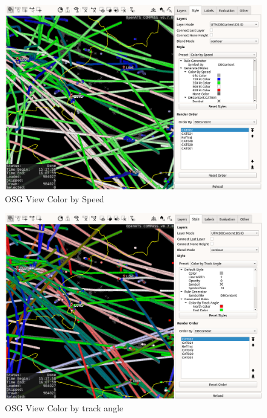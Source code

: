 \begin{figure}[H]
    \hspace*{-2.5cm}
    \includegraphics[width=19cm,frame]{figures/osgview_style_speed.png}
  \caption{OSG View Color by Speed}
\end{figure}

\begin{figure}[H]
    \hspace*{-2.5cm}
    \includegraphics[width=19cm,frame]{figures/osgview_style_track_angle.png}
  \caption{OSG View Color by track angle}
\end{figure}

